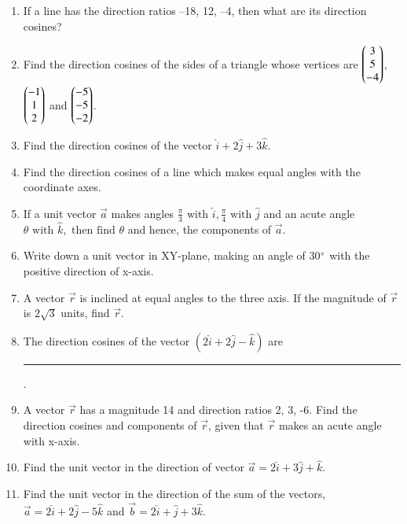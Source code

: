 \begin{enumerate}[label=\thesubsection.\arabic*, ref=\thesubsection.\theenumi]
	\\
\solution
		
\item If a line has the direction ratios –18,  12,  –4,  then what are its direction cosines?
		\\
		\solution
		
	\item Find the direction cosines of the sides of a triangle whose vertices are $\begin{pmatrix}3\\ 5\\-4 \end{pmatrix}$,  $\begin{pmatrix} -1\\1 \\2 \end{pmatrix}$ and $\begin{pmatrix}-5 \\-5 \\-2 \end{pmatrix}$.
		\\
		\solution
		
\item Find the direction cosines of the vector $\hat{i}+2\hat{j}+3\hat{k}$.
	\\
    \solution 
		
    \item Find the direction cosines of a line which makes equal angles with the coordinate
    axes.
		\\
		\solution
		
\item If a unit vector $\overrightarrow{a}$ makes angles $\frac{\pi}{3}\text{ with }\hat{i},  \frac{\pi}{4}\text{ with }\hat{j}$ and an acute angle $\theta \text{ with }\hat{k}, \text{ then find } \theta$ and hence,  the components of $\overrightarrow{a}$.
	\\
		\solution
		
\item Write down a unit vector in XY-plane,  making an angle of 30$\degree$ with the positive direction of x-axis.\\
\item A vector $\vec{r}$ is inclined at equal angles to the three axis. If the magnitude of $\vec{r}$ is $2\sqrt{3}$ units,  find $\vec{r}$.
\item The direction cosines of the vector $(2\hat{i}+2\hat{j}-\hat{k})$ are \noindent\rule{2cm}{0.4pt}.
\item A vector $\vec{r}$ has a magnitude 14 and direction ratios 2,  3,  -6. Find the direction cosines and components of $\vec{r}$,  given that $\vec{r}$ makes an acute angle with x-axis.
\item Find the unit vector in the direction of vector $\overrightarrow{a} = 2\hat{i} +3\hat{j} +\hat{k}$.
\item Find the unit vector in the direction of the sum of the vectors, $\overrightarrow{a} = 2\hat{i} +2\hat{j} -5\hat{k}$ and $\overrightarrow{b} = 2\hat{i} +\hat{j} +3\hat{k}$.

\end{enumerate}
